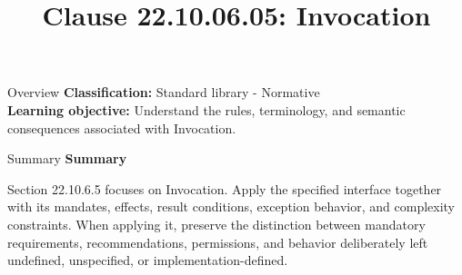 \documentclass[10pt,letterpaper]{article}
\title{Clause 22.10.06.05: Invocation}
\author{}
\date{}
\begin{document}
\maketitle
\begin{CornellOverviewBox}{Overview}
\textbf{Classification:} Standard library - Normative\\[2pt]
\textbf{Learning objective:} Understand the rules, terminology, and semantic consequences associated with Invocation.
\end{CornellOverviewBox}\begin{CornellSummaryBox}{Summary}
{\sffamily\bfseries\color{Accent} Summary}\par\vspace{3pt}Section 22.10.6.5 focuses on Invocation. Apply the specified interface together with its mandates, effects, result conditions, exception behavior, and complexity constraints. When applying it, preserve the distinction between mandatory requirements, recommendations, permissions, and behavior deliberately left undefined, unspecified, or implementation-defined.
\end{CornellSummaryBox}
\end{document}
